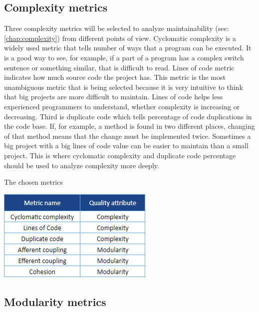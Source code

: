 \subsection{Complexity metrics}

Three complexity metrics will be selected to analyze maintainability (see: \autoref{chap:complexity}) from different points of view. Cyclomatic complexity is a widely used metric that tells number of ways that a program can be executed. It is a good way to see, for example, if a part of a program  has a complex switch sentence or something similar, that is difficult to read.
Lines of code metric indicates how much source code the project has. This metric is the most unambiguous metric that is being selected because it is very intuitive to think that big projects are more difficult to maintain. Lines of code helps less experienced programmers to understand, whether complexity is increasing or decreasing. Third is duplicate code which tells percentage of code duplications in the code base. If, for example, a method is found in two different places, changing of that method means that the change must be implemented twice.
Sometimes a big project with a big lines of code value can be easier to maintain than a small project. This is where cyclomatic complexity and duplicate code percentage should be used to analyze complexity more deeply.

\begin{table}[t!]
\centering
\caption{The chosen metrics}
\includegraphics[scale=1]{metrics.png}
\label{fig:metrics}
\end{table}

\subsection{Modularity metrics}

